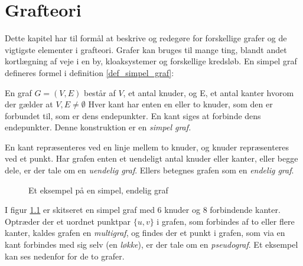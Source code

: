 \chapter{Grafteori}
\usetikzlibrary{arrows, automata}

Dette kapitel har til formål at beskrive og redegøre for forskellige grafer og de vigtigste elementer i grafteori. 
Grafer kan bruges til mange ting, blandt andet kortlægning af veje i en by, kloaksystemer og forskellige kredsløb.
En simpel graf defineres formel i definition \ref{def_simpel_graf}:


\begin{defn}
En graf $G = (V, E)$ består af $V$, et antal knuder, og E, et antal kanter hvorom der gælder at $V, E \neq \emptyset$
Hver kant har enten en eller to knuder, som den er forbundet til, som er dens endepunkter.
En kant siges at forbinde dens endepunkter. Denne konstruktion er en \it{simpel graf}.
\label{def_simpel_graf}
\end{defn}


\noindent En kant repræsenteres ved en linje mellem to knuder, og knuder repræsenteres ved et punkt. Har grafen enten et uendeligt antal knuder eller kanter, eller begge dele, er der tale om en \textit{uendelig graf}. Ellers betegnes grafen som en \textit{endelig graf}.


\begin{figure}[h]
\centering
{}
\caption{Et eksempel på en simpel, endelig graf} \label{simpel_graf}
\end{figure}


\noindent I figur \ref{simpel_graf} er skitseret en simpel graf med $6$ knuder og $8$ forbindende kanter. \\ 

\noindent Optræder der et uordnet punktpar $\lbrace u,v \rbrace$ i grafen, som forbindes af to eller flere kanter, kaldes grafen en \textit{multigraf}, og findes der et punkt i grafen, som via en kant forbindes med sig selv (en \textit{løkke}), er der tale om en \textit{pseudograf}. Et eksempel kan ses nedenfor for de to grafer.

